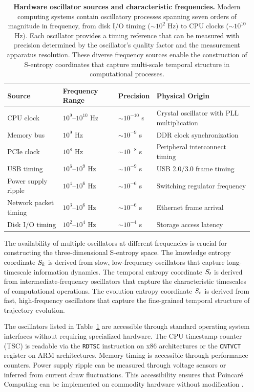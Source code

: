 \begin{table}[ht]
\centering
\begin{tabular}{lllp{5cm}}
\toprule
\textbf{Source} & \textbf{Frequency Range} & \textbf{Precision} & \textbf{Physical Origin} \\
\midrule
CPU clock & $10^9$--$10^{10}$ Hz & $\sim 10^{-10}$ s & Crystal oscillator with PLL multiplication \\
Memory bus & $10^9$ Hz & $\sim 10^{-9}$ s & DDR clock synchronization \\
PCIe clock & $10^8$ Hz & $\sim 10^{-8}$ s & Peripheral interconnect timing \\
USB timing & $10^6$--$10^9$ Hz & $\sim 10^{-9}$ s & USB 2.0/3.0 frame timing \\
Power supply ripple & $10^4$--$10^6$ Hz & $\sim 10^{-6}$ s & Switching regulator frequency \\
Network packet timing & $10^3$--$10^6$ Hz & $\sim 10^{-6}$ s & Ethernet frame arrival \\
Disk I/O timing & $10^2$--$10^4$ Hz & $\sim 10^{-4}$ s & Storage access latency \\
\bottomrule
\end{tabular}
\caption{\textbf{Hardware oscillator sources and characteristic frequencies.} Modern computing systems contain oscillatory processes spanning seven orders of magnitude in frequency, from disk I/O timing ($\sim 10^2$ Hz) to CPU clocks ($\sim 10^{10}$ Hz). Each oscillator provides a timing reference that can be measured with precision determined by the oscillator's quality factor and the measurement apparatus resolution. These diverse frequency sources enable the construction of S-entropy coordinates that capture multi-scale temporal structure in computational processes.}
\label{tab:oscillator_sources}
\end{table}

The availability of multiple oscillators at different frequencies is crucial for constructing the three-dimensional S-entropy space. The knowledge entropy coordinate $S_k$ is derived from slow, low-frequency oscillators that capture long-timescale information dynamics. The temporal entropy coordinate $S_t$ is derived from intermediate-frequency oscillators that capture the characteristic timescales of computational operations. The evolution entropy coordinate $S_e$ is derived from fast, high-frequency oscillators that capture the fine-grained temporal structure of trajectory evolution.

\begin{remark}
\label{rem:oscillator_access}
The oscillators listed in Table~\ref{tab:oscillator_sources} are accessible through standard operating system interfaces without requiring specialized hardware. The CPU timestamp counter (TSC) is readable via the \texttt{RDTSC} instruction on x86 architectures or the \texttt{CNTVCT} register on ARM architectures. Memory timing is accessible through performance counters. Power supply ripple can be measured through voltage sensors or inferred from current draw fluctuations. This accessibility ensures that Poincaré Computing can be implemented on commodity hardware without modification \citep{hennessy2017computer}.
\end{remark}

